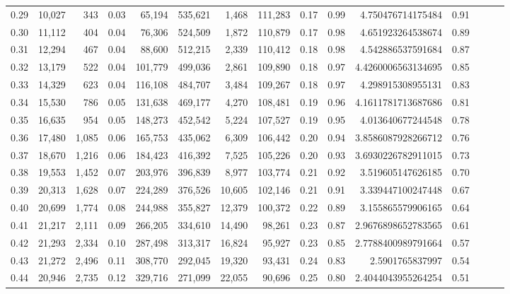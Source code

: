 \begin{tabular}{rrrrrrrrrrrrrrr}
0.29 &  10,027 &    343 &  0.03 &   65,194 &  535,621 &    1,468 &  111,283 &  0.17 &  0.99 &       4.750476714175484 &      0.91 \\
0.30 &  11,112 &    404 &  0.04 &   76,306 &  524,509 &    1,872 &  110,879 &  0.17 &  0.98 &       4.651923264538674 &      0.89 \\
0.31 &  12,294 &    467 &  0.04 &   88,600 &  512,215 &    2,339 &  110,412 &  0.18 &  0.98 &       4.542886537591684 &      0.87 \\
0.32 &  13,179 &    522 &  0.04 &  101,779 &  499,036 &    2,861 &  109,890 &  0.18 &  0.97 &      4.4260006563134695 &      0.85 \\
0.33 &  14,329 &    623 &  0.04 &  116,108 &  484,707 &    3,484 &  109,267 &  0.18 &  0.97 &       4.298915308955131 &      0.83 \\
0.34 &  15,530 &    786 &  0.05 &  131,638 &  469,177 &    4,270 &  108,481 &  0.19 &  0.96 &      4.1611781713687686 &      0.81 \\
0.35 &  16,635 &    954 &  0.05 &  148,273 &  452,542 &    5,224 &  107,527 &  0.19 &  0.95 &       4.013640677244548 &      0.78 \\
0.36 &  17,480 &  1,085 &  0.06 &  165,753 &  435,062 &    6,309 &  106,442 &  0.20 &  0.94 &      3.8586087928266712 &      0.76 \\
0.37 &  18,670 &  1,216 &  0.06 &  184,423 &  416,392 &    7,525 &  105,226 &  0.20 &  0.93 &      3.6930226782911015 &      0.73 \\
0.38 &  19,553 &  1,452 &  0.07 &  203,976 &  396,839 &    8,977 &  103,774 &  0.21 &  0.92 &       3.519605147626185 &      0.70 \\
0.39 &  20,313 &  1,628 &  0.07 &  224,289 &  376,526 &   10,605 &  102,146 &  0.21 &  0.91 &       3.339447100247448 &      0.67 \\
0.40 &  20,699 &  1,774 &  0.08 &  244,988 &  355,827 &   12,379 &  100,372 &  0.22 &  0.89 &       3.155865579906165 &      0.64 \\
0.41 &  21,217 &  2,111 &  0.09 &  266,205 &  334,610 &   14,490 &   98,261 &  0.23 &  0.87 &      2.9676898652783565 &      0.61 \\
0.42 &  21,293 &  2,334 &  0.10 &  287,498 &  313,317 &   16,824 &   95,927 &  0.23 &  0.85 &      2.7788400989791664 &      0.57 \\
0.43 &  21,272 &  2,496 &  0.11 &  308,770 &  292,045 &   19,320 &   93,431 &  0.24 &  0.83 &         2.5901765837997 &      0.54 \\
0.44 &  20,946 &  2,735 &  0.12 &  329,716 &  271,099 &   22,055 &   90,696 &  0.25 &  0.80 &      2.4044043955264254 &      0.51 \\

\end{tabular}

